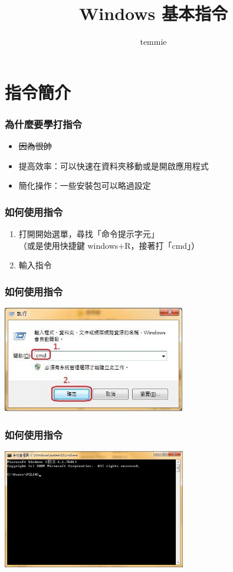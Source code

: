 \documentclass[mathserif]{beamer}
\title{Windows 基本指令}
\author{temmie}
\date{}
\begin{document}
\begin{frame}
    \titlepage
\end{frame}

\begin{frame}
    \tableofcontents
\end{frame}

\section{指令簡介}

\begin{frame}
    \frametitle{為什麼要學打指令}
    \begin{itemize}
        \item \sout{因為很帥}
        \item<2-> 提高效率：可以快速在資料夾移動或是開啟應用程式
        \item<2-> 簡化操作：一些安裝包可以略過設定
    \end{itemize}
\end{frame}

\begin{frame}
    \frametitle{如何使用指令}
    \begin{enumerate}
        \item 打開開始選單，尋找「命令提示字元」\\
        （或是使用快捷鍵 windows+R，接著打「cmd」）
        \item<2-> 輸入指令
    \end{enumerate}
\end{frame}

\begin{frame}
    \frametitle{如何使用指令}
    \includegraphics[width=8.0cm]{img/cmd_1.jpg}
\end{frame}

\begin{frame}
    \frametitle{如何使用指令}
    \includegraphics[width=8.0cm]{img/cmd_2.jpg}
\end{frame}
\end{document}
